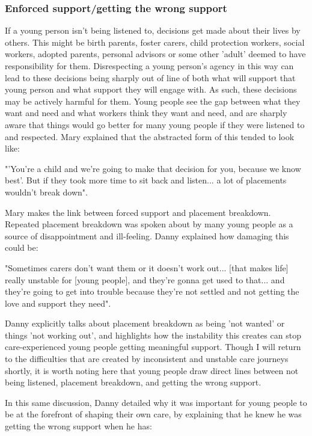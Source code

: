 \subsubsection{Enforced support/getting the wrong support}
If a young person isn't being listened to, decisions get made about their lives by others. This might be birth parents, foster carers, child protection workers, social workers, adopted parents, personal advisors or some other 'adult' deemed to have responsibility for them. Disrespecting a young person's agency in this way can lead to these decisions being sharply out of line of both what will support that young person and what support they will engage with. As such, these decisions may be actively harmful for them. Young people see the gap between what they want and need and what workers think they want and need, and are sharply aware that things would go better for many young people if they were listened to and respected. Mary explained that the abstracted form of this tended to look like:

"'You're a child and we're going to make that decision for you, because we know best'. But if they took more time to sit back and listen... a lot of placements wouldn't break down".

Mary makes the link between forced support and placement breakdown. Repeated placement breakdown was spoken about by many young people as a source of disappointment and ill-feeling. Danny explained how damaging this could be:

"Sometimes carers don't want them or it doesn't work out... [that makes life] really unstable for [young people], and they're gonna get used to that... and they're going to get into trouble because they're not settled and not getting the love and support they need".

Danny explicitly talks about placement breakdown as being 'not wanted' or things 'not working out', and highlights how the instability this creates can stop care-experienced young people getting meaningful support. Though I will return to the difficulties that are created by inconsistent and unstable care journeys shortly, it is worth noting here that young people draw direct lines between not being listened, placement breakdown, and getting the wrong support.

In this same discussion, Danny detailed why it was important for young people to be at the forefront of shaping their own care, by explaining that he knew he was getting the wrong support when he has:

